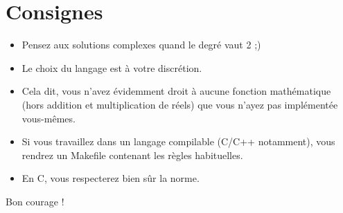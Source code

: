 \documentclass{42}
\begin{document}
\chapter{Consignes}
\begin{flushleft}
	\begin{itemize}
		\item Pensez aux solutions complexes quand le degré vaut 2 ;)
		\item Le choix du langage est à votre discrétion.

		\item Cela dit, vous n'avez évidemment droit à aucune fonction mathématique (hors addition et multiplication de réels) que vous n'ayez pas implémentée vous-mêmes.

		\item Si vous travaillez dans un langage compilable (C/C++ notamment), vous rendrez un Makefile contenant les règles habituelles.
		\item En C, vous respecterez bien sûr la norme.
	\end{itemize}
\end{flushleft}
Bon courage !

\end{document}
